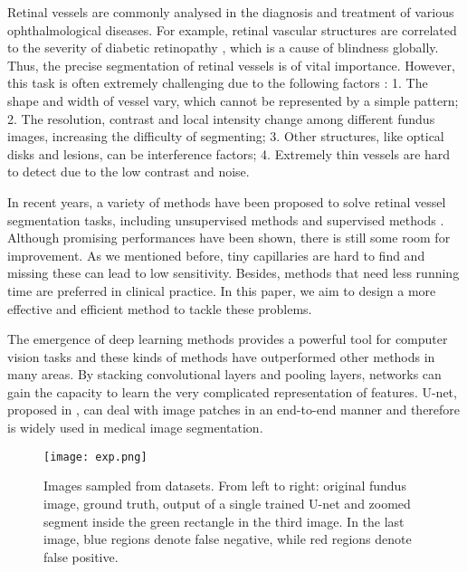 \documentclass[runningheads,a4paper]{llncs}
\begin{document}
Retinal vessels are commonly analysed in the diagnosis and treatment of various ophthalmological diseases. For example, retinal vascular structures are correlated to the severity of diabetic retinopathy \cite{jelinek2009automated}, which is a  cause of blindness globally. Thus, the precise segmentation of retinal vessels is of vital importance. However, this task is often extremely challenging due to the following factors \cite{fraz2012approach}: 1. The shape and width of vessel vary, which cannot be represented by a simple pattern; 2. The resolution, contrast and local intensity change among different fundus images, increasing the difficulty of segmenting; 3. Other structures, like optical disks and lesions, can be interference factors; 4. Extremely thin vessels are hard to detect due to the low contrast and noise.

In recent years, a variety of methods have been proposed to solve retinal vessel segmentation tasks, including unsupervised methods \cite{marin2011new} and supervised methods \cite{orlando2014learning}. Although promising performances have been shown, there is still some room for improvement. As we mentioned before, tiny capillaries are hard to find and missing these can lead to low sensitivity. Besides, methods that need less running time are preferred in clinical practice. In this paper, we aim to design a more effective and efficient method to tackle these problems.

The emergence of deep learning methods provides a powerful tool for computer vision tasks and these kinds of methods have outperformed other methods in many areas. By stacking convolutional layers and pooling layers, networks can gain the capacity to learn the very complicated representation of features. U-net, proposed in \cite{ronneberger2015u}, can deal with image patches in an end-to-end manner and therefore is widely used in medical image segmentation.

\begin{figure}[h]
	\centering
	\vspace{-10pt}
	\texttt{[image: exp.png]}
	\caption{Images sampled from datasets. From left to right: original fundus image, ground truth, output of a single trained U-net and zoomed segment inside the green rectangle in the third image. In the last image, blue regions denote false negative, while red regions denote false positive.}
	\vspace{-10pt}
	\label{fig:exp}
\end{figure}
\end{document}
